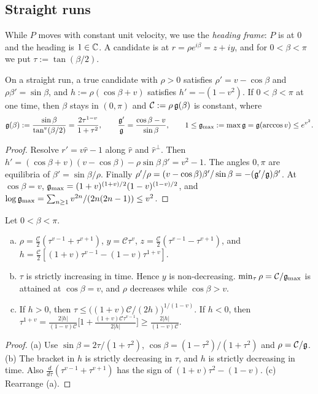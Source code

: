 \subsection{Straight runs}\label{app:B-runs}

While $P$ moves with constant unit velocity, we use the \emph{heading frame}: $P$ is at $0$ and the heading is $1\in\mathbb{C}$. A
candidate is at $r=\rho e^{i\beta}=z+iy$, and for $0<\beta<\pi$ we put $\tau:=\tan(\beta/2)$.

\begin{proposition}\label{prop:integrals}
On a straight run, a true candidate with $\rho>0$ satisfies $\rho'=v-\cos\beta$ and $\rho\beta'=\sin\beta$, and
$h:=\rho(\cos\beta+v)$ satisfies $h'=-(1-v^2)$. If $0<\beta<\pi$ at one time, then $\beta$ stays in $(0,\pi)$ and
$\mathcal C:=\rho\,\mathfrak{g}(\beta)$ is constant, where
\[
\mathfrak{g}(\beta):=\frac{\sin\beta}{\tan^v(\beta/2)}=\frac{2\tau^{1-v}}{1+\tau^2},\qquad\frac{\mathfrak{g}'}{\mathfrak{g}}=\frac{\cos\beta-v}{\sin\beta},\qquad
1\le\mathfrak{g}_{\max}:=\max\mathfrak{g}=\mathfrak{g}(\arccos v)\le e^{v^2}.
\]
\end{proposition}
\begin{proof}
Resolve $r'=v\hat r-1$ along $\hat r$ and $\hat r^\perp$. Then $h'=(\cos\beta+v)(v-\cos\beta)-\rho\sin\beta\,\beta'=v^2-1$. The
angles $0,\pi$ are equilibria of $\beta'=\sin\beta/\rho$. Finally $\rho'/\rho=(v-\cos\beta)\beta'/\sin\beta=-(\mathfrak{g}'/\mathfrak{g})\beta'$. At
$\cos\beta=v$, $\mathfrak{g}_{\max}=(1+v)^{(1+v)/2}(1-v)^{(1-v)/2}$, and $\log\mathfrak{g}_{\max}=\sum_{n\ge1}v^{2n}/(2n(2n-1))\le v^2$.
\end{proof}

\begin{lemma}\label{lem:tau}
Let $0<\beta<\pi$.
\begin{enumerate}[(a)]\setlength{\itemsep}{1pt}
\item $\rho=\frac{\mathcal C}2(\tau^{v-1}+\tau^{v+1})$, $y=\mathcal C\tau^v$, $z=\frac{\mathcal C}2(\tau^{v-1}-\tau^{v+1})$, and
$h=\frac{\mathcal C}2[(1+v)\tau^{v-1}-(1-v)\tau^{1+v}]$.
\item $\tau$ is strictly increasing in time. Hence $y$ is non-decreasing. $\min_\tau\rho=\mathcal C/\mathfrak{g}_{\max}$ is attained at $\cos\beta=v$,
and $\rho$ decreases while $\cos\beta>v$.
\item If $h>0$, then $\tau\le\bigl((1+v)\mathcal C/(2h)\bigr)^{1/(1-v)}$. If $h<0$, then
$\tau^{1+v}=\frac{2|h|}{(1-v)\mathcal C}\bigl[1+\frac{(1+v)\mathcal C\tau^{v-1}}{2|h|}\bigr]\ge\frac{2|h|}{(1-v)\mathcal C}$.
\end{enumerate}
\end{lemma}
\begin{proof}
(a) Use $\sin\beta=2\tau/(1+\tau^2)$, $\cos\beta=(1-\tau^2)/(1+\tau^2)$ and $\rho=\mathcal C/\mathfrak{g}$. (b) The bracket in $h$ is strictly
decreasing in $\tau$, and $h$ is strictly decreasing in time. Also $\frac{d}{d\tau}(\tau^{v-1}+\tau^{v+1})$ has the sign of
$(1+v)\tau^2-(1-v)$. (c) Rearrange (a).
\end{proof}

